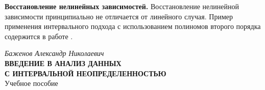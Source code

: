 \documentclass[a5paper,openany]{book}
\makeatletter
\renewcommand\@biblabel[1]{#1.}
\makeatother
\begin{document}
{\bf Восстановление нелинейных зависимостей.}
Восстановление нелинейной зависимости принципиально не отличается от линейного случая. 
Пример применения интервального подхода с использованием полиномов второго порядка содержится в работе \cite{Kovalenko2021}.


\thispagestyle{empty}

\newpage

\makeatletter
\renewcommand\@biblabel[1]{#1.}
\makeatother
{}

	
\raggedright\small\printindex   


\newpage
\begin{center}
	\hfill \break

	\Large{\it Баженов Александр Николаевич\\
		\hfill \break		\hfill \break		}
	{\Large	\bf{ВВЕДЕНИЕ В АНАЛИЗ ДАННЫХ\\
		С ИНТЕРВАЛЬНОЙ НЕОПРЕДЕЛЕННОСТЬЮ}}\\
	\hfill \break 	\hfill \break	
	\Large{	Учебное пособие	
	}\\
\end{center}

\hfill \break	
\end{document}
